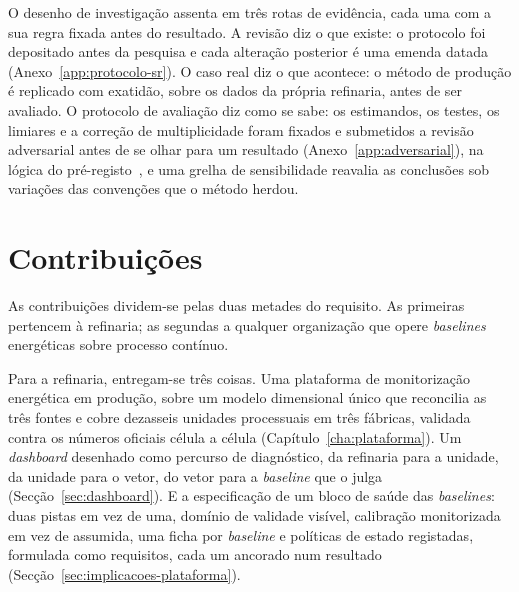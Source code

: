 

O desenho de investigação assenta em três rotas de evidência, cada uma
com a sua regra fixada antes do resultado. A revisão diz o que existe:
o protocolo foi depositado antes da pesquisa e cada alteração posterior
é uma emenda datada (Anexo~\ref{app:protocolo-sr}). O caso real diz o
que acontece: o método de produção é replicado com exatidão, sobre os
dados da própria refinaria, antes de ser avaliado. O protocolo de
avaliação diz como se sabe: os estimandos, os testes, os limiares e a
correção de multiplicidade foram fixados e submetidos a revisão
adversarial antes de se olhar para um resultado
(Anexo~\ref{app:adversarial}), na lógica do pré-registo~\cite{Nosek2018},
e uma grelha de sensibilidade reavalia as conclusões sob variações das
convenções que o método herdou.

\section{Contribuições}
\label{sec:contribuicoes}

As contribuições dividem-se pelas duas metades do requisito. As
primeiras pertencem à refinaria; as segundas a qualquer organização que
opere \emph{baselines} energéticas sobre processo contínuo.

Para a refinaria, entregam-se três coisas. Uma plataforma de
monitorização energética em produção, sobre um modelo dimensional único
que reconcilia as três fontes e cobre dezasseis unidades processuais em
três fábricas, validada contra os números oficiais célula a célula
(Capítulo~\ref{cha:plataforma}). Um \emph{dashboard} desenhado como
percurso de diagnóstico, da refinaria para a unidade, da unidade para o
vetor, do vetor para a \emph{baseline} que o julga
(Secção~\ref{sec:dashboard}). E a especificação de um bloco de saúde das
\emph{baselines}: duas pistas em vez de uma, domínio de validade
visível, calibração monitorizada em vez de assumida, uma ficha por
\emph{baseline} e políticas de estado registadas, formulada como
requisitos, cada um ancorado num resultado
(Secção~\ref{sec:implicacoes-plataforma}).

